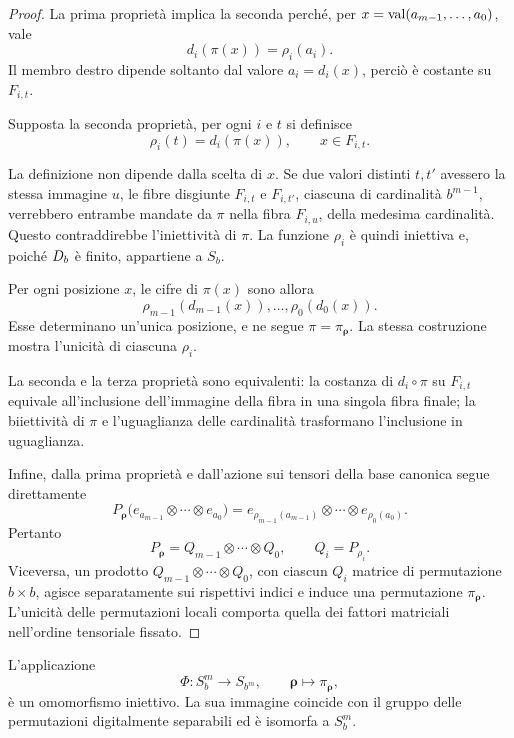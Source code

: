 	\begin{proof}
		La prima proprietà implica la seconda perché, per
		\(x=\operatorname{val}(a_{m-1},\dots,a_0)\), vale
		\[
		d_i(\pi(x))=\rho_i(a_i).
		\]
		Il membro destro dipende soltanto dal valore \(a_i=d_i(x)\), perciò è
		costante su \(F_{i,t}\).

		Supposta la seconda proprietà, per ogni \(i\) e \(t\) si definisce
		\[
		\rho_i(t)
		=
		d_i(\pi(x)),
		\qquad x\in F_{i,t}.
		\]
		
		La definizione non dipende dalla scelta di \(x\).
		Se due valori distinti \(t,t'\) avessero la stessa immagine \(u\),
		le fibre disgiunte \(F_{i,t}\) e \(F_{i,t'}\), ciascuna di cardinalità
		\(b^{m-1}\), verrebbero entrambe mandate da \(\pi\) nella fibra
		\(F_{i,u}\), della medesima cardinalità.
		Questo contraddirebbe l'iniettività di \(\pi\).
		La funzione \(\rho_i\) è quindi iniettiva e, poiché \(D_b\) è finito,
		appartiene a \(S_b\).

		Per ogni posizione \(x\), le cifre di \(\pi(x)\) sono allora
		\[
		\rho_{m-1}(d_{m-1}(x)),\dots,\rho_0(d_0(x)).
		\]
		Esse determinano un'unica posizione, e ne segue
		\(\pi=\pi_{\boldsymbol{\rho}}\). La stessa costruzione mostra l'unicità di
		ciascuna \(\rho_i\).

		La seconda e la terza proprietà sono equivalenti: la costanza di
		\(d_i\circ\pi\) su \(F_{i,t}\) equivale all'inclusione dell'immagine della
		fibra in una singola fibra finale; la biiettività di \(\pi\) e l'uguaglianza
		delle cardinalità trasformano l'inclusione in uguaglianza.

		Infine, dalla prima proprietà e dall'azione sui tensori della base canonica
			segue direttamente
			\[
			P_{\boldsymbol{\rho}}
			\bigl(e_{a_{m-1}}\otimes\cdots\otimes e_{a_0}\bigr)
			=
			e_{\rho_{m-1}(a_{m-1})}\otimes\cdots\otimes e_{\rho_0(a_0)}.
			\]
			Pertanto
			\[
			P_{\boldsymbol{\rho}}
			=
			Q_{m-1}\otimes\cdots\otimes Q_0,
			\qquad Q_i=P_{\rho_i}.
			\]
			Viceversa, un prodotto
			\(Q_{m-1}\otimes\cdots\otimes Q_0\), con ciascun \(Q_i\) matrice
			di permutazione \(b\times b\), agisce separatamente sui rispettivi
			indici e induce una permutazione \(\pi_{\boldsymbol{\rho}}\).
			L'unicità delle permutazioni locali comporta quella dei fattori matriciali
			nell'ordine tensoriale fissato.
	\end{proof}

	\begin{corollary}
		L'applicazione
		\[
		\Phi:S_b^m\longrightarrow S_{b^m},
		\qquad
		\boldsymbol{\rho}\longmapsto\pi_{\boldsymbol{\rho}},
		\]
		è un omomorfismo iniettivo. La sua immagine coincide con il gruppo delle
		permutazioni digitalmente separabili ed è isomorfa a \(S_b^m\).
	\end{corollary}

